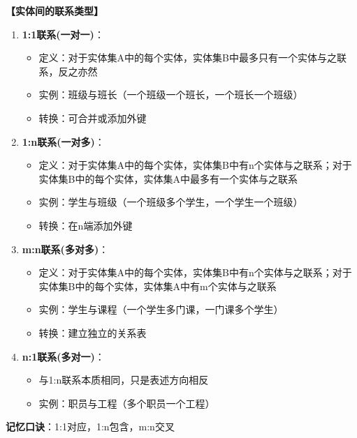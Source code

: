 \documentclass[12pt, a4paper]{article}
\newenvironment{bluebox}[1]{%
  \begin{trivlist}
  \item[\hskip\labelsep \textbf{#1}]
  \setlength{\parskip}{0.5ex}
  \setlength{\itemsep}{0.5ex}
}{%
  \end{trivlist}
  }
\begin{document}
\begin{bluebox}{联系类型分类}
	\textbf{【实体间的联系类型】}

	\begin{enumerate}[leftmargin=*, label=\textbf{\arabic*.}]
		\item \textbf{1:1联系(一对一)}：
		      \begin{itemize}[nosep]
			      \item 定义：对于实体集A中的每个实体，实体集B中最多只有一个实体与之联系，反之亦然
			      \item 实例：班级与班长（一个班级一个班长，一个班长一个班级）
			      \item 转换：可合并或添加外键
		      \end{itemize}

		\item \textbf{1:n联系(一对多)}：
		      \begin{itemize}[nosep]
			      \item 定义：对于实体集A中的每个实体，实体集B中有n个实体与之联系；对于实体集B中的每个实体，实体集A中最多有一个实体与之联系
			      \item 实例：学生与班级（一个班级多个学生，一个学生一个班级）
			      \item 转换：在n端添加外键
		      \end{itemize}

		\item \textbf{m:n联系(多对多)}：
		      \begin{itemize}[nosep]
			      \item 定义：对于实体集A中的每个实体，实体集B中有n个实体与之联系；对于实体集B中的每个实体，实体集A中有m个实体与之联系
			      \item 实例：学生与课程（一个学生多门课，一门课多个学生）
			      \item 转换：建立独立的关系表
		      \end{itemize}

		\item \textbf{n:1联系(多对一)}：
		      \begin{itemize}[nosep]
			      \item 与1:n联系本质相同，只是表述方向相反
			      \item 实例：职员与工程（多个职员一个工程）
		      \end{itemize}
	\end{enumerate}

	\textbf{记忆口诀}：1:1对应，1:n包含，m:n交叉
\end{bluebox}
\end{document}
